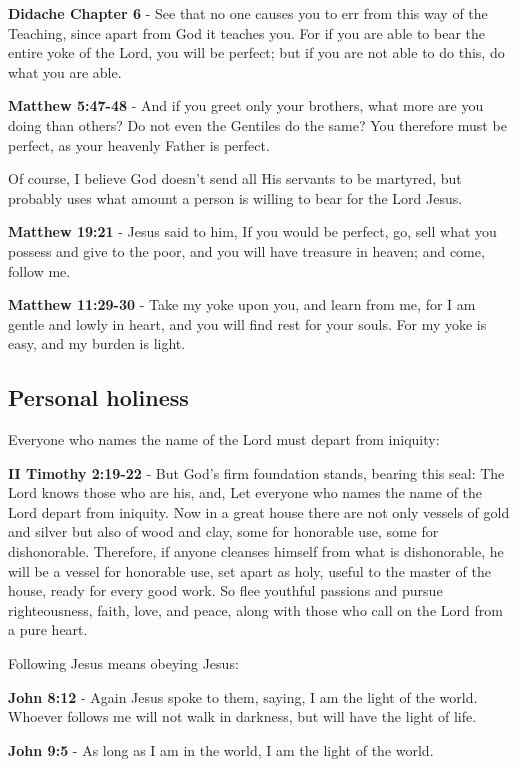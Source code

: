 \documentclass[11pt]{article}
\begin{document}
\textbf{Didache Chapter 6} - See that no one causes you to err from this way of the Teaching, since apart from God it teaches you. For if you are able to bear the entire yoke of the Lord, you will be perfect; but if you are not able to do this, do what you are able.

\textbf{Matthew 5:47-48} - And if you greet only your brothers, what more are you doing than others? Do not even the Gentiles do the same? You therefore must be perfect, as your heavenly Father is perfect.

Of course, I believe God doesn't send all His servants to be martyred, but probably uses what amount a person is willing to bear for the Lord Jesus.

\textbf{Matthew 19:21} - Jesus said to him, If you would be perfect, go, sell what you possess and give to the poor, and you will have treasure in heaven; and come, follow me.

\textbf{Matthew 11:29-30} - Take my yoke upon you, and learn from me, for I am gentle and lowly in heart, and you will find rest for your souls. For my yoke is easy, and my burden is light.

\subsection{Personal holiness}
\label{sec:orgb333d30}
Everyone who names the name of the Lord must depart from iniquity:

\textbf{II Timothy 2:19-22} - But God's firm foundation stands, bearing this seal: The Lord knows those who are his, and, Let everyone who names the name of the Lord depart from iniquity. Now in a great house there are not only vessels of gold and silver but also of wood and clay, some for honorable use, some for dishonorable. Therefore, if anyone cleanses himself from what is dishonorable, he will be a vessel for honorable use, set apart as holy, useful to the master of the house, ready for every good work. So flee youthful passions and pursue righteousness, faith, love, and peace, along with those who call on the Lord from a pure heart.

Following Jesus means obeying Jesus:

\textbf{John 8:12} - Again Jesus spoke to them, saying, I am the light of the world. Whoever follows me will not walk in darkness, but will have the light of life.

\textbf{John 9:5} - As long as I am in the world, I am the light of the world.
\end{document}

